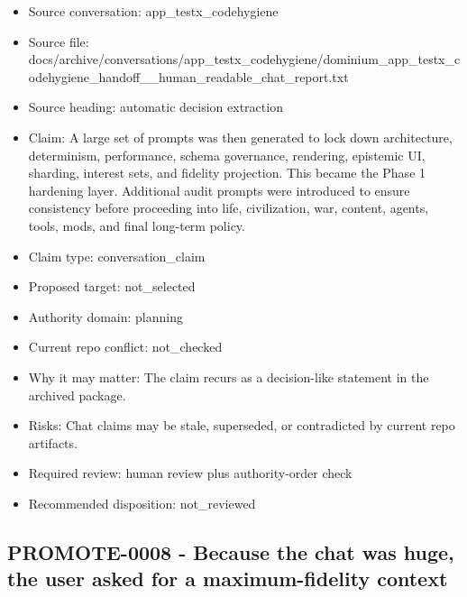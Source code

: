 \documentclass[11pt,a4paper]{report}
\begin{document}
\begin{itemize}
\item Source conversation: app\_testx\_codehygiene
\item Source file: docs/archive/conversations/app\_testx\_codehygiene/dominium\_app\_testx\_codehygiene\_handoff\_\_human\_readable\_chat\_report.txt
\item Source heading: automatic decision extraction
\item Claim: A large set of prompts was then generated to lock down architecture, determinism, performance, schema governance, rendering, epistemic UI, sharding, interest sets, and fidelity projection. This became the Phase 1 hardening layer. Additional audit prompts were introduced to ensure consistency before proceeding into life, civilization, war, content, agents, tools, mods, and final long-term policy.
\item Claim type: conversation\_claim
\item Proposed target: not\_selected
\item Authority domain: planning
\item Current repo conflict: not\_checked
\item Why it may matter: The claim recurs as a decision-like statement in the archived package.
\item Risks: Chat claims may be stale, superseded, or contradicted by current repo artifacts.
\item Required review: human review plus authority-order check
\item Recommended disposition: not\_reviewed
\end{itemize}

\subsection{PROMOTE-0008 - Because the chat was huge, the user asked for a maximum-fidelity context}
\end{document}
